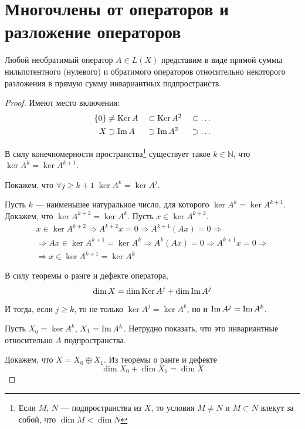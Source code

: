 \section{Многочлены от операторов и разложение операторов}
\begin{lemma} \label{le:noninvertibledevcomposition}
    Любой необратимый оператор $A\in L(X)$ представим в виде прямой суммы
    нильпотентного (нулевого) и обратимого операторов относительно некоторого
    разложения в прямую сумму инвариантных подпространств.
\end{lemma}

\begin{proof}
    Имеют место включения:
    \begin{alignat*}{3}
        \left\{0\right\} & \neq \operatorname{Ker} A &&\subset \operatorname{Ker} A^2 &&\subset \dots \\
        X & \supset \operatorname{Im} A &&\supset \operatorname{Im} A^2 &&\supset \dots
    \end{alignat*}

    В силу конечномерности пространства\footnote{Если $M$, $N$ — подпространства из $X$,
    то условия $M \neq N$ и $M \subset N$ влекут за собой, что $\dim M < \dim N$} 
    существует такое $k \in \mathbb{N}$, что $\ker A^k = \ker A^{k+1}$.

    Покажем, что $\forall j \geq k+1 \; \ker A^k = \ker A^j$.
    
    Пусть $k$ — наименьшее натуральное число, для которого $\ker A^k = \ker
    A^{k+1}$. Докажем, что $\ker A^{k+2} = \ker A^k$. Пусть $x \in \ker
    A^{k+2}$.
    \begin{multline*}
        x \in \ker A^{k+2} \Rightarrow A^{k+2}x = 0 \Rightarrow A^{k+1}(Ax) = 0
        \Rightarrow \\ \Rightarrow Ax \in \ker A^{k+1} = \ker A^{k} \Rightarrow
        A^k(Ax) = 0 \Rightarrow A^{k+1}x = 0 \Rightarrow \\ \Rightarrow x \in \ker A^{k+1} =
        \ker A^k
    \end{multline*}

    В силу теоремы о ранге и дефекте оператора,
    \[ \dim X = \dim \operatorname{Ker} A^j + \dim \operatorname{Im} A^j \]
    
    И тогда, если $j \geq k$, то не только $\ker A^j = \ker A^k$, но и $\operatorname{Im} A^j = \operatorname{Im} A^k$.

    Пусть $X_0 = \ker A^k$, $X_1 = \operatorname{Im} A^k$. Нетрудно показать, что это инвариантные относительно $A$
    подпространства.

    Докажем, что $ X = X_0 \oplus X_1 $. Из теоремы о ранге и дефекте
    \[ \dim X_0 + \dim X_1 = \dim X \]


\end{proof}
